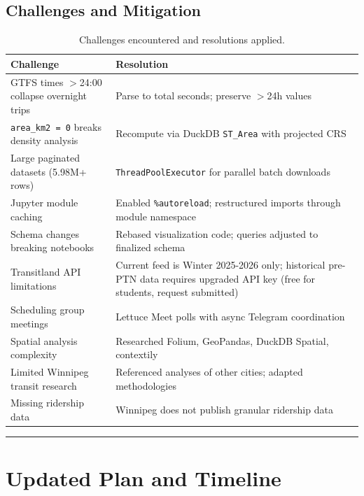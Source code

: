 \documentclass[11pt]{article}
\begin{document}
\subsection{Challenges and Mitigation}

\begin{table}[H]
\centering
\scriptsize
\renewcommand{\arraystretch}{1.05}
\begin{tabularx}{\textwidth}{@{}l X@{}}
\toprule
\textbf{Challenge} & \textbf{Resolution} \\
\midrule
GTFS times $>$24:00 collapse overnight trips & Parse to total seconds; preserve $>$24h values \\
\texttt{area\_km2 = 0} breaks density analysis & Recompute via DuckDB \texttt{ST\_Area} with projected CRS \\
Large paginated datasets (5.98M+ rows) & \texttt{ThreadPoolExecutor} for parallel batch downloads \\
Jupyter module caching & Enabled \texttt{\%autoreload}; restructured imports through module namespace \\
Schema changes breaking notebooks & Rebased visualization code; queries adjusted to finalized schema \\
Transitland API limitations & Current feed is Winter 2025-2026 only; historical pre-PTN data requires upgraded API key (free for students, request submitted) \\
Scheduling group meetings & Lettuce Meet polls with async Telegram coordination \\
Spatial analysis complexity & Researched Folium, GeoPandas, DuckDB Spatial, contextily \\
Limited Winnipeg transit research & Referenced analyses of other cities; adapted methodologies \\
Missing ridership data & Winnipeg does not publish granular ridership data \\
\bottomrule
\end{tabularx}
\caption{Challenges encountered and resolutions applied.}
\label{tab:challenges}
\end{table}

\noindent\rule{\textwidth}{0.4pt}

\section{Updated Plan and Timeline}
\end{document}
